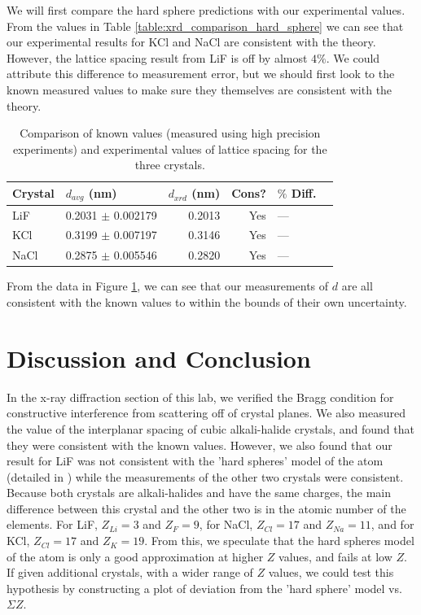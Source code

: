 \documentclass[%
 reprint,
 amsmath,amssymb,
 aps,
 pra,
]{revtex4-1}
\begin{document}
We will first compare the hard sphere predictions with our experimental values. From the values in Table \ref{table:xrd_comparison_hard_sphere} we can see that our experimental results for KCl and NaCl are consistent with the theory. However, the lattice spacing result from LiF is off by almost $4\%$. We could attribute this difference to measurement error, but we should first look to the known measured values to make sure they themselves are consistent with the theory.

\begin{table}[htbp]
	\begin{center}
	\begin{tabular}{|l|r|r|r|l|l|}
		\hline
		Crystal & \multicolumn{1}{l|}{$d_{avg}$ (nm)} & \multicolumn{1}{l|}{$d_{xrd}$ (nm)} & Cons? & $\%$ Diff. \\ \hline
		LiF & 0.2031 $\pm$ 0.002179 & 0.2013 & Yes & --- \\ \hline
		KCl & 0.3199 $\pm$ 0.007197 & 0.3146 & Yes & --- \\ \hline
		NaCl & 0.2875 $\pm$ 0.005546 & 0.2820 & Yes & --- \\ \hline
	\end{tabular}
	\end{center}
	\caption{Comparison of known values (measured using high precision experiments) and experimental values of lattice spacing for the three crystals.}
	\label{table:xrd_comparison_known}
\end{table}

From the data in Figure \ref{table:xrd_comparison_known}, we can see that our measurements of $d$ are all consistent with the known values to within the bounds of their own uncertainty.

\section{Discussion and Conclusion}

In the x-ray diffraction section of this lab, we verified the Bragg condition for constructive interference from scattering off of crystal planes. We also measured the value of the interplanar spacing of cubic alkali-halide crystals, and found that they were consistent with the known values. However, we also found that our result for LiF was not consistent with the 'hard spheres' model of the atom (detailed in \cite{hard_sphere, hard_sphere2}) while the measurements of the other two crystals were consistent. Because both crystals are alkali-halides and have the same charges, the main difference between this crystal and the other two is in the atomic number of the elements. For LiF, $Z_{Li} = 3$ and $Z_{F} = 9$, for NaCl, $Z_{Cl} = 17$ and $Z_{Na} = 11$, and for KCl, $Z_{Cl} = 17$ and $Z_{K} = 19$. From this, we speculate that the hard spheres model of the atom is only a good approximation at higher $Z$ values, and fails at low $Z$. If given additional crystals, with a wider range of $Z$ values, we could test this hypothesis by constructing a plot of deviation from the 'hard sphere' model vs. $\Sigma Z$.
\end{document}
